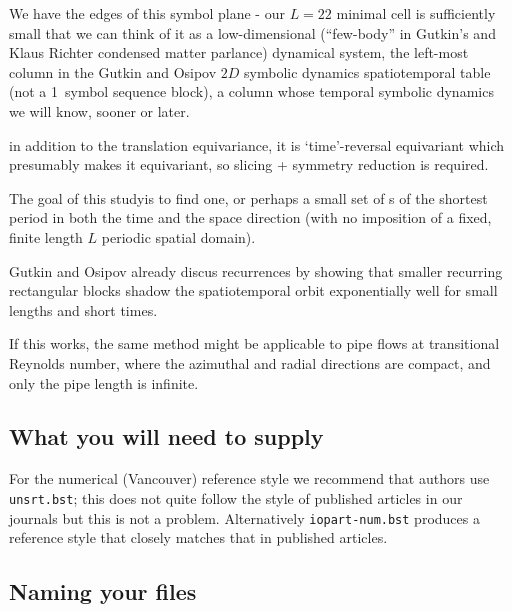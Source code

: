 \documentclass[12pt]{iopart}
\begin{document}
We have the edges of this symbol plane - our $L=22$ minimal cell is
sufficiently small that we can think of it as a low-dimensional
(``few-body'' in Gutkin's and Klaus Richter
condensed matter parlance) dynamical system, the left-most column in the
Gutkin and Osipov $2D$ symbolic dynamics spatiotemporal
table (not a 1\dmn\ symbol sequence block), a column whose temporal
symbolic dynamics we will know, sooner or later.

in addition to the translation equivariance, it is `time'-reversal
equivariant which presumably makes it  equivariant, so slicing +
 symmetry reduction is required.

The goal of this studyis to find one, or perhaps a
small set of \rpo s of the shortest period in both the time and the space
direction (with no imposition of a fixed, finite length $L$ periodic
spatial domain).

Gutkin and Osipov already discus
recurrences by showing that smaller recurring rectangular blocks shadow
the spatiotemporal orbit exponentially well for small lengths and short
times.

If this works, the same method might be applicable to pipe flows at
transitional Reynolds number, where the azimuthal and radial directions
are compact, and only the pipe length is infinite.


\subsection{What you will need to supply}

For the numerical (Vancouver) reference style we recommend that authors
use \verb"unsrt.bst"; this does not quite follow the style of published
articles in our journals but this is not a problem. Alternatively
\verb"iopart-num.bst" produces a reference style that closely matches
that in published articles.

\subsection{Naming your files}
\end{document}

